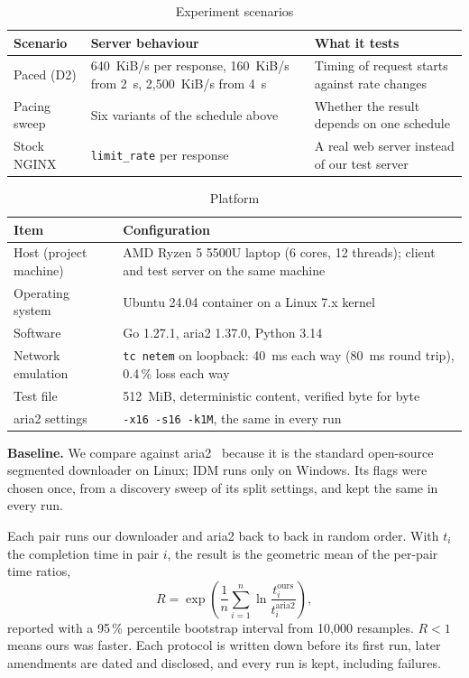 \documentclass[11pt,a4paper]{report}
\newcommand{\code}[1]{\texttt{#1}}
\begin{document}
\begin{table}[H]\centering
\caption{Experiment scenarios}\label{tab:scenarios}
\begin{tabularx}{\linewidth}{@{}lLL@{}}
\toprule
\textbf{Scenario} & \textbf{Server behaviour} & \textbf{What it tests}\\
\midrule
Paced (D2) & 640~KiB/s per response, 160~KiB/s from 2~s, 2{,}500~KiB/s from 4~s & Timing of request starts against rate changes\\
Pacing sweep & Six variants of the schedule above & Whether the result depends on one schedule\\
Stock NGINX & \code{limit\_rate} per response & A real web server instead of our test server\\
\bottomrule
\end{tabularx}
\end{table}

\begin{table}[H]\centering
\caption{Platform}\label{tab:platform}
\begin{tabularx}{\linewidth}{@{}lL@{}}
\toprule
\textbf{Item} & \textbf{Configuration}\\
\midrule
Host (project machine) & AMD Ryzen 5 5500U laptop (6 cores, 12 threads); client and test server on the same machine\\
Operating system & Ubuntu 24.04 container on a Linux 7.x kernel\\
Software & Go 1.27.1, aria2 1.37.0, Python 3.14\\
Network emulation & \code{tc netem} on loopback: 40~ms each way (80~ms round trip), 0.4\,\% loss each way\\
Test file & 512~MiB, deterministic content, verified byte for byte\\
aria2 settings & \code{-x16 -s16 -k1M}, the same in every run\\
\bottomrule
\end{tabularx}
\end{table}

\textbf{Baseline.} We compare against aria2~\cite{aria2} because it is the standard open-source segmented downloader on Linux; IDM runs only on Windows. Its flags were chosen once, from a discovery sweep of its split settings, and kept the same in every run.

Each pair runs our downloader and aria2 back to back in random order. With $t_i$ the completion time in pair $i$, the result is the geometric mean of the per-pair time ratios,
\begin{equation}
R = \exp\!\left(\frac{1}{n}\sum_{i=1}^{n}\ln\frac{t_i^{\text{ours}}}{t_i^{\text{aria2}}}\right),
\end{equation}
reported with a 95\,\% percentile bootstrap interval from 10{,}000 resamples. $R < 1$ means ours was faster. Each protocol is written down before its first run, later amendments are dated and disclosed, and every run is kept, including failures.
\end{document}
